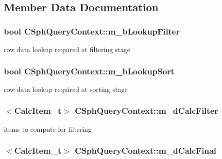 \subsection{Member Data Documentation}
\hypertarget{classCSphQueryContext_adc2fdf623920be11414ea4940593e538}{
\subsubsection[{m\-\_\-b\-Lookup\-Filter}]{\setlength{\rightskip}{0pt plus 5cm}bool C\-Sph\-Query\-Context\-::m\-\_\-b\-Lookup\-Filter}}\label{classCSphQueryContext_adc2fdf623920be11414ea4940593e538}


row data lookup required at filtering stage 

\hypertarget{classCSphQueryContext_afb0929e88a2b40a38c50f04dd90929fd}{
\subsubsection[{m\-\_\-b\-Lookup\-Sort}]{\setlength{\rightskip}{0pt plus 5cm}bool C\-Sph\-Query\-Context\-::m\-\_\-b\-Lookup\-Sort}}\label{classCSphQueryContext_afb0929e88a2b40a38c50f04dd90929fd}


row data lookup required at sorting stage 

\hypertarget{classCSphQueryContext_a91e8831b84db253a2ca879097441859e}{
\subsubsection[{m\-\_\-d\-Calc\-Filter}]{$<${\bf Calc\-Item\-\_\-t}$>$ C\-Sph\-Query\-Context\-::m\-\_\-d\-Calc\-Filter}}\label{classCSphQueryContext_a91e8831b84db253a2ca879097441859e}


items to compute for filtering 

\hypertarget{classCSphQueryContext_abe6a6a77e323d80d90ff494bb11acc3d}{
\subsubsection[{m\-\_\-d\-Calc\-Final}]{$<${\bf Calc\-Item\-\_\-t}$>$ C\-Sph\-Query\-Context\-::m\-\_\-d\-Calc\-Final}}\label{classCSphQueryContext_abe6a6a77e323d80d90ff494bb11acc3d}



